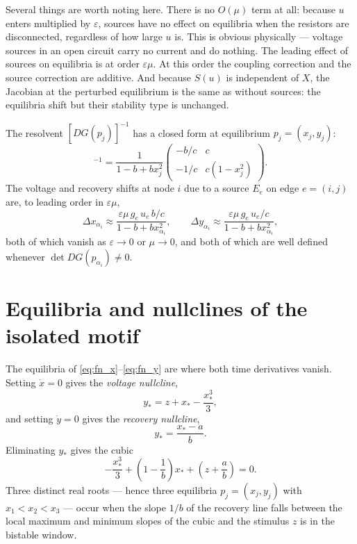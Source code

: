 \documentclass[11pt]{article}
\begin{document}
Several things are worth noting here. There is no $O(\mu)$ term at all:
because $u$ enters multiplied by $\varepsilon$, sources have no effect
on equilibria when the resistors are disconnected, regardless of how
large $u$ is. This is obvious physically --- voltage sources in an open
circuit carry no current and do nothing. The leading effect of sources
on equilibria is at order $\varepsilon\mu$. At this order the coupling
correction and the source correction are additive. And because $S(u)$
is independent of $X$, the Jacobian at the perturbed equilibrium is the
same as without sources: the equilibria shift but their stability type
is unchanged.

The resolvent $[DG(p_j)]^{-1}$ has a closed form at equilibrium
$p_j = (x_j,y_j)$:
\begin{equation}
  [DG(p_j)]^{-1}
  =
  \frac{1}{1-b+bx_j^2}
  \begin{pmatrix}
    -b/c & c \\
    -1/c & c(1-x_j^2)
  \end{pmatrix}.
  \label{eq:Aj_inv}
\end{equation}
The voltage and recovery shifts at node $i$ due to a source $E_e$ on
edge $e = (i,j)$ are, to leading order in $\varepsilon\mu$,
\begin{equation}
  \Delta x_{\alpha_i}
  \approx
  \frac{\varepsilon\mu\, g_e\, u_e\, b/c}{1 - b + bx_{\alpha_i}^2},
  \qquad
  \Delta y_{\alpha_i}
  \approx
  \frac{\varepsilon\mu\, g_e\, u_e/c}{1 - b + bx_{\alpha_i}^2},
  \label{eq:shifts}
\end{equation}
both of which vanish as $\varepsilon \to 0$ or $\mu \to 0$, and both of
which are well defined whenever $\det DG(p_{\alpha_i}) \neq 0$.


\section{Equilibria and nullclines of the isolated motif}
\label{sec:equilibria}


The equilibria of \eqref{eq:fn_x}--\eqref{eq:fn_y} are where both
time derivatives vanish. Setting $\dot x = 0$ gives the \emph{voltage
nullcline},
\begin{equation}
  y_* = z + x_* - \frac{x_*^3}{3},
  \label{eq:vnull}
\end{equation}
and setting $\dot y = 0$ gives the \emph{recovery nullcline},
\begin{equation}
  y_* = \frac{x_* - a}{b}.
  \label{eq:rnull}
\end{equation}
Eliminating $y_*$ gives the cubic
\begin{equation}
  -\frac{x_*^3}{3}
  +
  \left(1 - \frac{1}{b}\right)x_*
  +
  \left(z + \frac{a}{b}\right)
  = 0.
  \label{eq:cubic_std}
\end{equation}
Three distinct real roots --- hence three equilibria $p_j = (x_j, y_j)$
with $x_1 < x_2 < x_3$ --- occur when the slope $1/b$ of the recovery
line falls between the local maximum and minimum slopes of the cubic and
the stimulus $z$ is in the bistable window.
\end{document}
